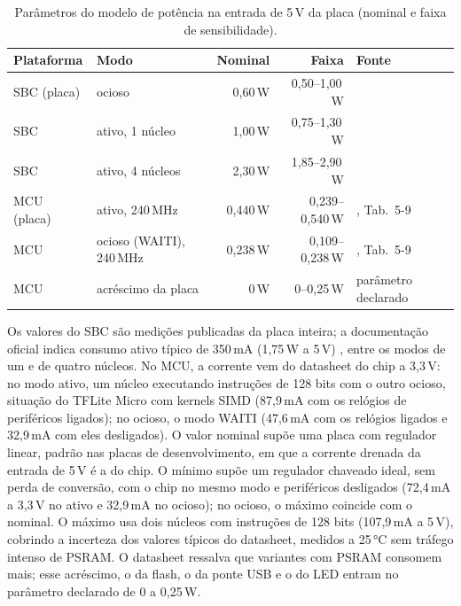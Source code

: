 \documentclass[11pt,a4paper]{article}
\begin{document}
\begin{table}[H]\centering\small
\caption{Parâmetros do modelo de potência na entrada de 5\,V da placa (nominal e faixa de sensibilidade).}\label{tab:pot}
\begin{tabularx}{\linewidth}{llrrL}\toprule
\textbf{Plataforma} & \textbf{Modo} & \textbf{Nominal} & \textbf{Faixa} & \textbf{Fonte}\\\midrule
SBC (placa) & ocioso & 0,60\,W & 0,50--1,00\,W & \cite{cnx2021zero2w,geerling2021zero2w}\\
SBC & ativo, 1 núcleo & 1,00\,W & 0,75--1,30\,W & \cite{geerling2021zero2w}\\
SBC & ativo, 4 núcleos & 2,30\,W & 1,85--2,90\,W & \cite{geerling2021zero2w,toms2021zero2w}\\
MCU (placa) & ativo, 240\,MHz & 0,440\,W & 0,239--0,540\,W & \cite{espressif_esp32s3_ds}, Tab.~5-9\\
MCU & ocioso (WAITI), 240\,MHz & 0,238\,W & 0,109--0,238\,W & \cite{espressif_esp32s3_ds}, Tab.~5-9\\
MCU & acréscimo da placa & 0\,W & 0--0,25\,W & parâmetro declarado\\\bottomrule
\end{tabularx}
\end{table}

\noindent Os valores do SBC são medições publicadas da placa inteira; a documentação oficial indica consumo ativo
típico de 350\,mA (1,75\,W a 5\,V) \cite{raspberrypi_power}, entre os modos de um e de quatro núcleos. No MCU, a
corrente vem do datasheet do chip a 3,3\,V: no modo ativo, um núcleo executando instruções de 128 bits com o outro
ocioso, situação do TFLite Micro com kernels SIMD (87,9\,mA com os relógios de periféricos ligados); no ocioso, o
modo WAITI (47,6\,mA com os relógios ligados e 32,9\,mA com eles desligados). O valor nominal supõe uma placa com regulador linear, padrão nas placas de desenvolvimento,
em que a corrente drenada da entrada de 5\,V é a do chip. O mínimo supõe um regulador chaveado ideal, sem perda de
conversão, com o chip no mesmo modo e periféricos desligados (72,4\,mA a 3,3\,V no ativo e 32,9\,mA no ocioso); no ocioso, o máximo coincide com o nominal. O máximo usa dois núcleos com
instruções de 128 bits (107,9\,mA a 5\,V), cobrindo a incerteza dos valores típicos do datasheet, medidos a 25\,°C
sem tráfego intenso de PSRAM. O datasheet ressalva que variantes com PSRAM consomem mais; esse acréscimo, o da
flash, o da ponte USB e o do LED entram no parâmetro declarado de 0 a 0,25\,W.
\end{document}
